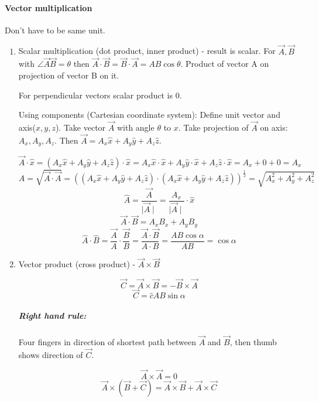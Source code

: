 \paragraph{Vector multiplication} Don't have to be same unit.
\begin{enumerate}
	\item Scalar multiplication (dot product, inner product) - result is scalar. For $\vec{A}, \vec{B}$ with $\angle\vec{A}\vec{B}=\theta$ then $\vec{A}\cdot\vec{B}=\vec{B}\cdot\vec{A}=AB\cos\theta$.
	Product of vector A on projection of vector B on it.

\begin{center}	
	
\end{center}
	
	For perpendicular vectors scalar product is $0$.
	
		Using components (Cartesian coordinate system):
		Define unit vector and axis($x,y,z$). Take vector $\vec{A}$ with angle $\theta$ to $x$.
		Take projection of $\vec{A}$ on axis: $A_x,A_y,A_z$. Then $\vec{A}=A_x\hat{x}+A_y\hat{y}+A_z\hat{z}$.
		
		$$\vec{A}\cdot\hat{x}=(A_x\hat{x}+A_y\hat{y}+A_z\hat{z})\cdot\hat{x}=A_x\hat{x}\cdot\hat{x}+A_y\hat{y}\cdot\hat{x}+A_z\hat{z}\cdot\hat{x}=A_x + 0 + 0 = A_x$$
		$$A=\sqrt{\vec{A}\cdot\vec{A}}=((A_x\hat{x}+A_y\hat{y}+A_z\hat{z})\cdot(A_x\hat{x}+A_y\hat{y}+A_z\hat{z}))^\frac{1}{2}=\sqrt{A_x^2 + A_y^2 + A_z^2}$$
		$$\hat{A}=\frac{\vec{A}}{\mid \vec{A} \mid}=\frac{A_x}{\mid \vec{A} \mid}\cdot\hat{x}$$
		$$\vec{A} \cdot \vec{B} = A_xB_x + A_yB_y$$
		$$\hat{A} \cdot \hat{B} = \frac{\vec{A}}{A} \cdot \frac{\vec{B}}{B} = \frac{\vec{A} \cdot \vec{B}}{A\cdot B} = \frac{AB\cos \alpha}{AB} = \cos \alpha$$
	\item Vector product (cross product) - $\vec{A} \times \vec{B}$
	
	$$\vec{C} = \vec{A} \times \vec{B} = -\vec{B} \times \vec{A}$$
	$$\vec{C} = \hat{c}AB\sin\alpha$$
	
	\subparagraph{Right hand rule:}
	
	Four fingers in direction of shortest path between $\vec{A}$ and $\vec{B}$, then thumb shows direction of $\vec{C}$.

\begin{center}	
	
\end{center}
	
	$$\vec{A} \times \vec{A} = 0$$	
	$$\vec{A} \times(\vec{B} + \vec{C}) =  \vec{A} \times\vec{B} + \vec{A} \times\vec{C}$$
	
\end{enumerate}